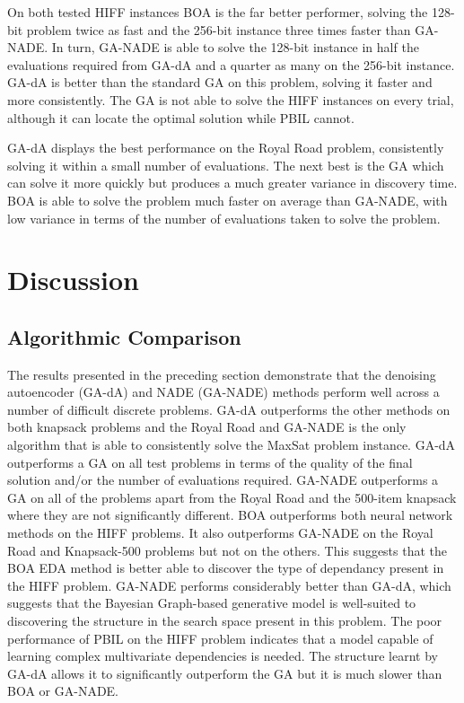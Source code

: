 \documentclass[twoside]{article}
\begin{document}
On both tested HIFF instances BOA is the far better performer, solving the 128-bit problem twice as fast and the 256-bit instance three times faster than GA-NADE. In turn, GA-NADE is able to solve the 128-bit instance in half the evaluations required from GA-dA and a quarter as many on the 256-bit instance. GA-dA is better than the standard GA on this problem, solving it faster and more consistently. The GA is not able to solve the HIFF instances on every trial, although it can locate the optimal solution while PBIL cannot.

GA-dA displays the best performance on the Royal Road problem, consistently solving it within a small number of evaluations. The next best is the GA which can solve it more quickly but produces a much greater variance in discovery time. BOA is able to solve the problem much faster on average than GA-NADE, with low variance in terms of the number of evaluations taken to solve the problem.

\section{Discussion}

\subsection{Algorithmic Comparison}
The results presented in the preceding section demonstrate that the denoising autoencoder (GA-dA) and NADE (GA-NADE) methods perform well across a number of difficult discrete problems. GA-dA outperforms the other methods on both knapsack problems and the Royal Road and GA-NADE is the only algorithm that is able to consistently solve the MaxSat problem instance. GA-dA outperforms a GA on all test problems in terms of the quality of the final solution and/or the number of evaluations required. GA-NADE outperforms a GA on all of the problems apart from the Royal Road and the 500-item knapsack where they are not significantly different. BOA outperforms both neural network methods on the HIFF problems. It also outperforms GA-NADE on the Royal Road and Knapsack-500 problems but not on the others. This suggests that the BOA EDA method is better able to discover the type of dependancy present in the HIFF problem. GA-NADE performs considerably better than GA-dA, which suggests that the Bayesian Graph-based generative model is well-suited to discovering the structure in the search space present in this problem. The poor performance of PBIL on the HIFF problem indicates that a model capable of learning complex multivariate dependencies is needed. The structure learnt by GA-dA allows it to significantly outperform the GA but it is much slower than BOA or GA-NADE. 
\end{document}
